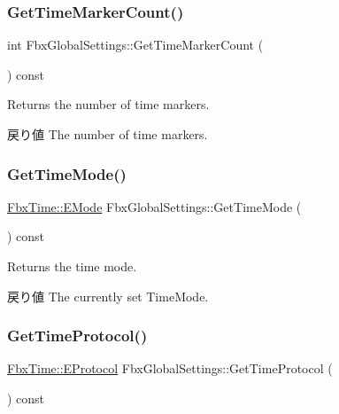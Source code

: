 \subsubsection{\texorpdfstring{Get\+Time\+Marker\+Count()}{GetTimeMarkerCount()}}
{\footnotesize\ttfamily int Fbx\+Global\+Settings\+::\+Get\+Time\+Marker\+Count (\begin{DoxyParamCaption}{ }\end{DoxyParamCaption}) const}

Returns the number of time markers. \begin{DoxyReturn}{戻り値}
The number of time markers. 
\end{DoxyReturn}
\mbox{\label{class_fbx_global_settings_af9b3a1685ccc3ed00f8addec82ca8a23}} 
\subsubsection{\texorpdfstring{Get\+Time\+Mode()}{GetTimeMode()}}
{\footnotesize\ttfamily \hyperlink{class_fbx_time_acc529b00a0e8d4c3da3702449ca93031}{Fbx\+Time\+::\+E\+Mode} Fbx\+Global\+Settings\+::\+Get\+Time\+Mode (\begin{DoxyParamCaption}{ }\end{DoxyParamCaption}) const}

Returns the time mode. \begin{DoxyReturn}{戻り値}
The currently set Time\+Mode. 
\end{DoxyReturn}
\mbox{\label{class_fbx_global_settings_a1514e7da28ac65299ee142c3376fb4e7}} 
\subsubsection{\texorpdfstring{Get\+Time\+Protocol()}{GetTimeProtocol()}}
{\footnotesize\ttfamily \hyperlink{class_fbx_time_a10ffa1fdce0aa7f63ec24bdd23afff4b}{Fbx\+Time\+::\+E\+Protocol} Fbx\+Global\+Settings\+::\+Get\+Time\+Protocol (\begin{DoxyParamCaption}{ }\end{DoxyParamCaption}) const}

